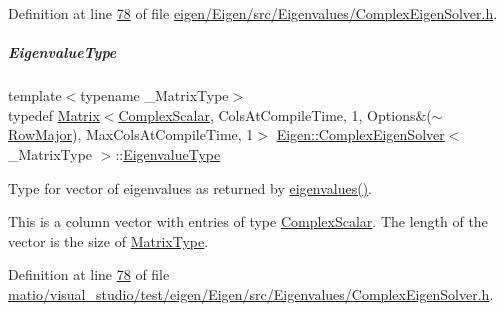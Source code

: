 Definition at line \hyperlink{eigen_2_eigen_2src_2_eigenvalues_2_complex_eigen_solver_8h_source_l00078}{78} of file \hyperlink{eigen_2_eigen_2src_2_eigenvalues_2_complex_eigen_solver_8h_source}{eigen/\+Eigen/src/\+Eigenvalues/\+Complex\+Eigen\+Solver.\+h}.

\mbox{\label{group___eigenvalues___module_ad3a663b1ff5200a098dabbbf9b7162b1}} 
\subparagraph{\texorpdfstring{Eigenvalue\+Type}{EigenvalueType}\hspace{0.1cm}{\footnotesize\ttfamily [2/2]}}
{\footnotesize\ttfamily template$<$typename \+\_\+\+Matrix\+Type$>$ \\
typedef \hyperlink{group___core___module_class_eigen_1_1_matrix}{Matrix}$<$\hyperlink{group___eigenvalues___module_a3604c99a69fac3bee42c88cb2b589143}{Complex\+Scalar}, Cols\+At\+Compile\+Time, 1, Options\&($\sim$\hyperlink{group__enums_ggaacded1a18ae58b0f554751f6cdf9eb13acfcde9cd8677c5f7caf6bd603666aae3}{Row\+Major}), Max\+Cols\+At\+Compile\+Time, 1$>$ \hyperlink{group___eigenvalues___module_class_eigen_1_1_complex_eigen_solver}{Eigen\+::\+Complex\+Eigen\+Solver}$<$ \+\_\+\+Matrix\+Type $>$\+::\hyperlink{group___eigenvalues___module_ad3a663b1ff5200a098dabbbf9b7162b1}{Eigenvalue\+Type}}



Type for vector of eigenvalues as returned by \hyperlink{group___eigenvalues___module_a10c25c7620e7faedcd39991cce3a757b}{eigenvalues()}. 

This is a column vector with entries of type \hyperlink{group___eigenvalues___module_a3604c99a69fac3bee42c88cb2b589143}{Complex\+Scalar}. The length of the vector is the size of \hyperlink{group___eigenvalues___module_ad61f6278843a601096276c9a72c0252f}{Matrix\+Type}. 

Definition at line \hyperlink{matio_2visual__studio_2test_2eigen_2_eigen_2src_2_eigenvalues_2_complex_eigen_solver_8h_source_l00078}{78} of file \hyperlink{matio_2visual__studio_2test_2eigen_2_eigen_2src_2_eigenvalues_2_complex_eigen_solver_8h_source}{matio/visual\+\_\+studio/test/eigen/\+Eigen/src/\+Eigenvalues/\+Complex\+Eigen\+Solver.\+h}.

